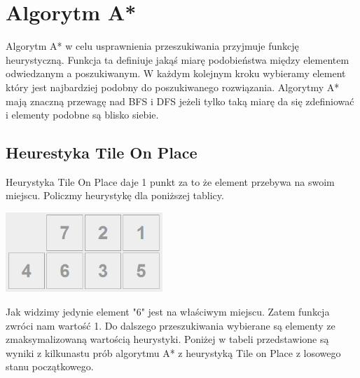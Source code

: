 \documentclass{classrep}
\begin{document}
\section{Algorytm A*}
Algorytm A* w celu usprawnienia przeszukiwania przyjmuje funkcję heurystyczną. Funkcja ta definiuje jakąś miarę podobieństwa między elementem odwiedzanym a poszukiwanym. W każdym kolejnym kroku wybieramy element który jest najbardziej podobny do poszukiwanego rozwiązania. Algorytmy A* mają znaczną przewagę nad BFS i DFS jeżeli tylko taką miarę da się zdefiniować i elementy podobne są blisko siebie.

\subsection{Heurestyka Tile On Place}
Heurystyka Tile On Place daje 1 punkt za to że element przebywa na swoim miejscu. Policzmy heurystykę dla poniższej tablicy.
\begin{center}
	\includegraphics[height=3cm]{2x4unsolvable.png}
\end{center}
Jak widzimy jedynie element "6" jest na właściwym miejscu. Zatem funkcja zwróci nam wartość 1. Do dalszego przeszukiwania wybierane są elementy ze zmaksymalizowaną wartością heurystyki. Poniżej w tabeli przedstawione są wyniki z kilkunastu prób algorytmu A* z heurystyką Tile on Place z losowego stanu początkowego.
\end{document}
